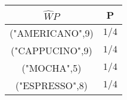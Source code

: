 \begin{tabular}{c|c}

$\widehat{W}P$  & P     \\ \hline
("AMERICANO",9) & $1/4$ \\ \hline
("CAPPUCINO",9) & $1/4$ \\ \hline
("MOCHA",5)     & $1/4$ \\ \hline
("ESPRESSO",8)  & $1/4$ \\ \hline
\end{tabular}
